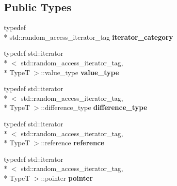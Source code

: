 \subsection*{Public Types}
\begin{DoxyCompactItemize}
\item 
\hypertarget{classkeycpp_1_1_pointer_iterator_a1ef73c2e3452ec372b1bcc67e4d32fa6}{typedef \\*
std\-::random\-\_\-access\-\_\-iterator\-\_\-tag {\bfseries iterator\-\_\-category}}\label{classkeycpp_1_1_pointer_iterator_a1ef73c2e3452ec372b1bcc67e4d32fa6}

\item 
\hypertarget{classkeycpp_1_1_pointer_iterator_a5cd2295724a4697502177353b7d1f8cf}{typedef std\-::iterator\\*
$<$ std\-::random\-\_\-access\-\_\-iterator\-\_\-tag, \\*
Type\-T $>$\-::value\-\_\-type {\bfseries value\-\_\-type}}\label{classkeycpp_1_1_pointer_iterator_a5cd2295724a4697502177353b7d1f8cf}

\item 
\hypertarget{classkeycpp_1_1_pointer_iterator_afe9aba481fceabc3ff98dfd05591e199}{typedef std\-::iterator\\*
$<$ std\-::random\-\_\-access\-\_\-iterator\-\_\-tag, \\*
Type\-T $>$\-::difference\-\_\-type {\bfseries difference\-\_\-type}}\label{classkeycpp_1_1_pointer_iterator_afe9aba481fceabc3ff98dfd05591e199}

\item 
\hypertarget{classkeycpp_1_1_pointer_iterator_afb9ff3879d195f7361980a126756ebc0}{typedef std\-::iterator\\*
$<$ std\-::random\-\_\-access\-\_\-iterator\-\_\-tag, \\*
Type\-T $>$\-::reference {\bfseries reference}}\label{classkeycpp_1_1_pointer_iterator_afb9ff3879d195f7361980a126756ebc0}

\item 
\hypertarget{classkeycpp_1_1_pointer_iterator_adada9309981bd33390b4b461c8f5b853}{typedef std\-::iterator\\*
$<$ std\-::random\-\_\-access\-\_\-iterator\-\_\-tag, \\*
Type\-T $>$\-::pointer {\bfseries pointer}}\label{classkeycpp_1_1_pointer_iterator_adada9309981bd33390b4b461c8f5b853}

\end{DoxyCompactItemize}
